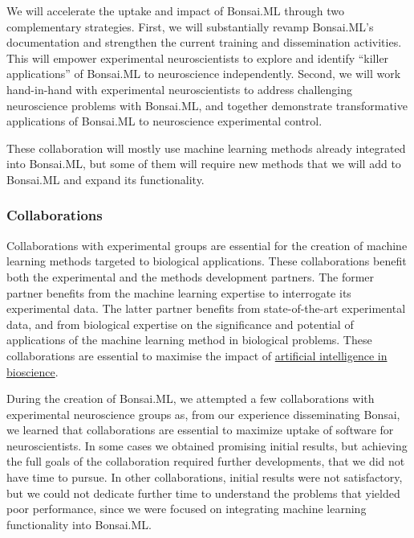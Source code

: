We will accelerate the uptake and impact of Bonsai.ML through two complementary
strategies.
%
First, we will substantially revamp Bonsai.ML's documentation and strengthen
the current training and dissemination activities. This will empower
experimental neuroscientists to explore and identify ``killer applications'' of
Bonsai.ML to neuroscience independently.
%
Second, we will work hand-in-hand with experimental neuroscientists to address
challenging neuroscience problems with Bonsai.ML, and together demonstrate
transformative applications of Bonsai.ML to neuroscience experimental control.

%

These collaboration will mostly use machine learning methods already integrated
into Bonsai.ML, but some of them will require new methods that we will add to
Bonsai.ML and expand its functionality.

\subsubsection{Collaborations}

Collaborations with experimental groups are essential for the creation of
machine learning methods targeted to biological applications. These
collaborations benefit both the experimental and the methods development
partners.
%
The former partner benefits from the machine learning expertise to interrogate its experimental data.
%
The latter partner benefits from state-of-the-art experimental
data, and from biological expertise on the significance and potential of applications of
the machine learning method in biological problems.
%
These collaborations are essential to maximise the impact of
\href{https://www.ukri.org/what-we-do/browse-our-areas-of-investment-and-support/artificial-intelligence-in-bioscience/}{artificial
intelligence in bioscience}.

During the creation of Bonsai.ML, we attempted a few collaborations with
experimental neuroscience groups as, from our experience disseminating Bonsai,
we learned that collaborations are essential to maximize uptake of software for
neuroscientists.
%
In some cases we obtained promising initial results, but achieving the full
goals of the collaboration required further developments, that we did not have
time to pursue.
%
In other collaborations, initial results were not satisfactory, but we could
not dedicate further time to understand the problems that yielded poor
performance, since we were focused on integrating machine learning
functionality into Bonsai.ML.

